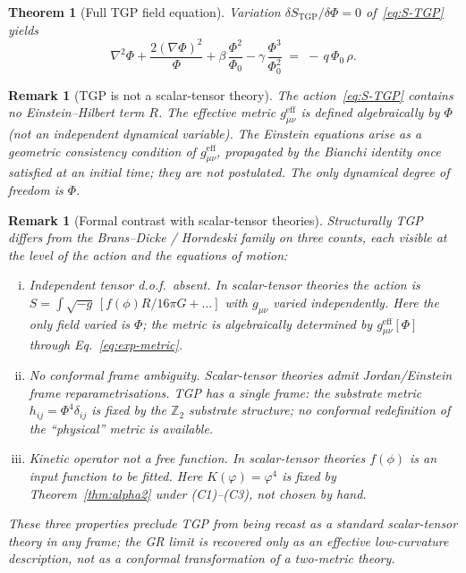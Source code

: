 \documentclass[11pt,a4paper]{article}
\renewcommand{\Phi}{\varPhi}
\newcommand{\PhiZero}{\varPhi_{0}}
\newcommand{\Zp}{\mathbb{Z}_{2}}
\newtheorem{theorem}[axiom]{Theorem}
\newtheorem{remark}[axiom]{Remark}
\begin{document}
\begin{theorem}[Full TGP field equation]\label{thm:field-eq}
Variation $\delta S_{\mathrm{TGP}}/\delta\Phi=0$ of~\eqref{eq:S-TGP} yields
\begin{equation}\label{eq:field-eq}
  \boxed{\;
    \nabla^{2}\Phi
    +\frac{2(\nabla\Phi)^{2}}{\Phi}
    +\beta\,\frac{\Phi^{2}}{\PhiZero}
    -\gamma\,\frac{\Phi^{3}}{\PhiZero^{2}}
    \;=\;-\,q\,\PhiZero\,\rho.
  \;}
\end{equation}
\end{theorem}

\begin{remark}[TGP is not a scalar-tensor theory]\label{rem:not-ST}
The action~\eqref{eq:S-TGP} contains \emph{no} Einstein--Hilbert term $R$.
The effective metric $g_{\mu\nu}^{\mathrm{eff}}$ is defined algebraically
by $\Phi$ (not an independent dynamical variable). The Einstein equations
arise as a geometric consistency condition of $g_{\mu\nu}^{\mathrm{eff}}$,
propagated by the Bianchi identity once satisfied at an initial time; they
are not postulated. The only dynamical degree of freedom is $\Phi$.
\end{remark}

\begin{remark}[Formal contrast with scalar-tensor theories]\label{rem:ST-formal}
Structurally TGP differs from the Brans--Dicke / Horndeski family on three
counts, each visible at the level of the action and the equations of
motion:
\begin{enumerate}[(i),nosep]
  \item \emph{Independent tensor d.o.f.\ absent.} In scalar-tensor
    theories the action is $S=\int\sqrt{-g}\,[f(\phi)R/16\pi G+\ldots]$
    with $g_{\mu\nu}$ varied independently. Here the only field varied
    is $\Phi$; the metric is algebraically determined by
    $g_{\mu\nu}^{\mathrm{eff}}[\Phi]$ through Eq.~\eqref{eq:exp-metric}.
  \item \emph{No conformal frame ambiguity.} Scalar-tensor theories
    admit Jordan/Einstein frame reparametrisations. TGP has a single
    frame: the substrate metric $h_{ij}=\Phi^{4}\delta_{ij}$ is fixed by
    the $\Zp$ substrate structure; no conformal redefinition of the
    ``physical'' metric is available.
  \item \emph{Kinetic operator not a free function.} In scalar-tensor
    theories $f(\phi)$ is an input function to be fitted. Here
    $K(\varphi)=\varphi^{4}$ is fixed by
    Theorem~\ref{thm:alpha2} under (C1)--(C3), not chosen by hand.
\end{enumerate}
These three properties preclude TGP from being recast as a standard
scalar-tensor theory in any frame; the GR limit is recovered only as an
effective low-curvature description, not as a conformal transformation
of a two-metric theory.
\end{remark}
\end{document}
